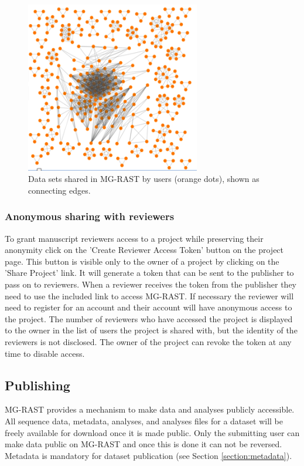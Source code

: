 \documentclass[12pt,fullpage]{report}
\begin{document}
\begin{figure}
\begin{center}
\includegraphics[width=3in]{Images/Data-sharing-in-mg-rast}
\end{center}
\caption{
Data sets shared in MG-RAST by users (orange dots), shown as connecting edges.
}
\label{fig:Data-sharing-in-mg-rast}
\end{figure}
\subsubsection{Anonymous sharing with reviewers}
\label{section:reviewer_sharing}
To grant manuscript reviewers access to a project while preserving their anonymity click on the 'Create Reviewer Access Token' button on the project page. This button is visible only to the owner of a project by clicking on the 'Share Project' link. It will generate a token that can be sent to the publisher to pass on to reviewers. When a reviewer receives the token from the publisher they need to use the included link to access MG-RAST. If necessary the reviewer will need to register for an account and their account will have anonymous access to the project. The number of reviewers who have accessed the project is displayed to the owner in the list of users the project is shared with, but the identity of the reviewers is not disclosed. The owner of the project can revoke the token at any time to disable access.
\subsection{Publishing}
\label{section:publishing}
MG-RAST provides a mechanism to make data and analyses publicly accessible. All sequence data, metadata, analyses, and analyses files for a dataset will be freely available for download once it is made public. Only the submitting user can make data public on MG-RAST and once this is done it can not be reversed. Metadata is mandatory for dataset publication (see Section \ref{section:metadata}).
\end{document}
